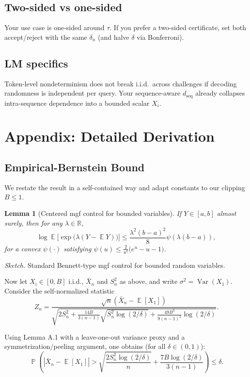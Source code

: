 \documentclass[11pt]{article}
\newtheorem{lemma}[theorem]{Lemma}
\DeclareMathOperator{\E}{\mathbb{E}}
\DeclareMathOperator{\Var}{Var}
\DeclareMathOperator{\Prob}{\mathbb{P}}
\newcommand{\R}{\mathbb{R}}
\begin{document}
\subsection{Two-sided vs one-sided}
Your use case is one-sided around $\tau$. If you prefer a two-sided certificate, set both accept/reject with the same $\delta_n$ (and halve $\delta$ via Bonferroni).

\subsection{LM specifics}
Token-level nondeterminism does not break i.i.d.\ across challenges if decoding randomness is independent per query. Your sequence-aware $d_{\text{seq}}$ already collapses intra-sequence dependence into a bounded scalar $X_i$.

\section{Appendix: Detailed Derivation}

\subsection{Empirical-Bernstein Bound}

We restate the result in a self-contained way and adapt constants to our clipping $B\le 1$.

\begin{lemma}[Centered mgf control for bounded variables]
If $Y\in[a,b]$ almost surely, then for any $\lambda\in\R$,
\begin{equation}
\log \E\big[\exp\big(\lambda(Y-\E Y)\big)\big] \le \frac{\lambda^2 (b-a)^2}{8}\psi\!\left(\lambda(b-a)\right),
\end{equation}
for a convex $\psi(\cdot)$ satisfying $\psi(u)\le \frac{2}{u^2}\big(e^u-u-1\big)$.
\end{lemma}

\textit{Sketch.} Standard Bennett-type mgf control for bounded random variables.

Now let $X_i\in[0,B]$ i.i.d., $\bar{X}_n$ and $S_n^2$ as above, and write $\sigma^2=\Var(X_1)$. Consider the self-normalized statistic
\begin{equation}
Z_n = \frac{\sqrt{n}(\bar{X}_n-\E[X_1])}{\sqrt{2S_n^2 + \frac{14 B}{3(n-1)}\sqrt{S_n^2\log(2/\delta)} + \frac{49 B^2}{9(n-1)^2}\log(2/\delta)}}.
\end{equation}

Using Lemma A.1 with a leave-one-out variance proxy and a symmetrization/peeling argument, one obtains (for all $\delta\in(0,1)$):
\begin{equation}
\Prob\left(|\bar{X}_n - \E[X_1]| > \sqrt{\frac{2 S_n^2 \log(2/\delta)}{n}} + \frac{7B\log(2/\delta)}{3(n-1)}\right) \le \delta.
\end{equation}
\end{document}
